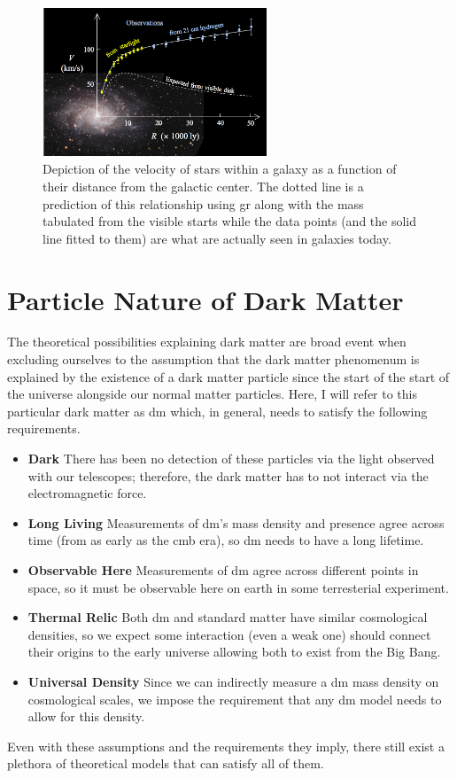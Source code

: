\begin{figure}
  \centering
  \includegraphics[width=0.6\textwidth]{figures/theory/rotation-curve-evidence-for-dm.png}
  \caption{
    Depiction of the velocity of stars within a galaxy as a function of their distance
    from the galactic center. The dotted line is a prediction of this relationship using
    \gls{gr} along with the mass tabulated from the visible starts while the data points
    (and the solid line fitted to them) are what are actually seen in galaxies today.
  }
  \label{fig:rotation-curve}
\end{figure}

\section{Particle Nature of Dark Matter}
The theoretical possibilities explaining dark matter are broad \cite{darksectors-2016} event when
excluding ourselves to the assumption that the dark matter phenomenum is explained by the existence
of a dark matter particle since the start of the start of the universe alongside our normal matter
particles. Here, I will refer to this particular dark matter as \gls{dm} which, in general, needs
to satisfy the following requirements.
\begin{itemize}
  \item \textbf{Dark} There has been no detection of these particles via the light observed with our telescopes;
        therefore, the dark matter has to not interact via the electromagnetic force.
  \item \textbf{Long Living} Measurements of \gls{dm}'s mass density and presence agree across time
        (from as early as the \gls{cmb} era), so \gls{dm} needs to have a long lifetime.
  \item \textbf{Observable Here} Measurements of \gls{dm} agree across different points in space,
        so it must be observable here on earth in some terresterial experiment.
  \item \textbf{Thermal Relic} Both \gls{dm} and standard matter have similar
        cosmological densities, so we expect some interaction (even a weak one) should connect their
        origins to the early universe allowing both to exist from the Big Bang.
  \item \textbf{Universal Density} Since we can indirectly measure a \gls{dm} mass density on
        cosmological scales, we impose the requirement that any \gls{dm} model needs to allow for
        this density.
\end{itemize}
Even with these assumptions and the requirements they imply, there still exist a plethora of
theoretical models that can satisfy all of them.

